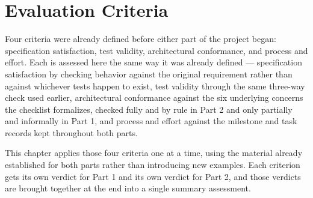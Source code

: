 \section{Evaluation Criteria}

Four criteria were already defined before either part of the project began: specification satisfaction, test validity, architectural conformance, and process and effort. Each is assessed here the same way it was already defined --- specification satisfaction by checking behavior against the original requirement rather than against whichever tests happen to exist, test validity through the same three-way check used earlier, architectural conformance against the six underlying concerns the checklist formalizes, checked fully and by rule in Part 2 and only partially and informally in Part 1, and process and effort against the milestone and task records kept throughout both parts.

This chapter applies those four criteria one at a time, using the material already established for both parts rather than introducing new examples. Each criterion gets its own verdict for Part 1 and its own verdict for Part 2, and those verdicts are brought together at the end into a single summary assessment.

